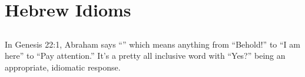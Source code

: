 \chapter{Hebrew Idioms}\label{app:idioms}
\section{}
In Genesis 22:1, Abraham says ``'' which means anything from ``Behold!'' to ``I am here'' to ``Pay attention.'' It's a pretty all inclusive word with ``Yes?'' being an appropriate, idiomatic response.
